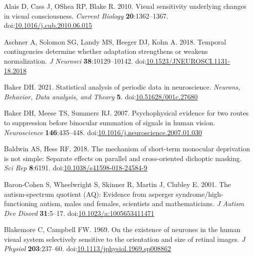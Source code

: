 \documentclass[
]{article}
\newlength{\cslhangindent}
\newlength{\cslentryspacingunit} %
\newenvironment{CSLReferences}[2] %
 {%
  \setlength{\parindent}{0pt}
  \ifodd #1
  \let\oldpar\par
  \def\par{\hangindent=\cslhangindent\oldpar}
  \fi
  \setlength{\parskip}{#2\cslentryspacingunit}
 }%
 {}
\begin{document}
\hypertarget{refs}{}
\begin{CSLReferences}{1}{0}
\leavevmode{}%
Alais D, Cass J, OShea RP, Blake R. 2010. Visual sensitivity underlying changes in visual consciousness. \emph{Current Biology} \textbf{20}:1362--1367. doi:\href{https://doi.org/10.1016/j.cub.2010.06.015}{10.1016/j.cub.2010.06.015}

\leavevmode{}%
Aschner A, Solomon SG, Landy MS, Heeger DJ, Kohn A. 2018. Temporal contingencies determine whether adaptation strengthens or weakens normalization. \emph{J Neurosci} \textbf{38}:10129--10142. doi:\href{https://doi.org/10.1523/JNEUROSCI.1131-18.2018}{10.1523/JNEUROSCI.1131-18.2018}

\leavevmode{}%
Baker DH. 2021. Statistical analysis of periodic data in neuroscience. \emph{Neurons, Behavior, Data analysis, and Theory} \textbf{5}. doi:\href{https://doi.org/10.51628/001c.27680}{10.51628/001c.27680}

\leavevmode{}%
Baker DH, Meese TS, Summers RJ. 2007. Psychophysical evidence for two routes to suppression before binocular summation of signals in human vision. \emph{Neuroscience} \textbf{146}:435--448. doi:\href{https://doi.org/10.1016/j.neuroscience.2007.01.030}{10.1016/j.neuroscience.2007.01.030}

\leavevmode{}%
Baldwin AS, Hess RF. 2018. The mechanism of short-term monocular deprivation is not simple: Separate effects on parallel and cross-oriented dichoptic masking. \emph{Sci Rep} \textbf{8}:6191. doi:\href{https://doi.org/10.1038/s41598-018-24584-9}{10.1038/s41598-018-24584-9}

\leavevmode{}%
Baron-Cohen S, Wheelwright S, Skinner R, Martin J, Clubley E. 2001. The autism-spectrum quotient (AQ): Evidence from asperger syndrome/high-functioning autism, males and females, scientists and mathematicians. \emph{J Autism Dev Disord} \textbf{31}:5--17. doi:\href{https://doi.org/10.1023/a:1005653411471}{10.1023/a:1005653411471}

\leavevmode{}%
Blakemore C, Campbell FW. 1969. On the existence of neurones in the human visual system selectively sensitive to the orientation and size of retinal images. \emph{J Physiol} \textbf{203}:237--60. doi:\href{https://doi.org/10.1113/jphysiol.1969.sp008862}{10.1113/jphysiol.1969.sp008862}


\end{CSLReferences}
\end{document}
